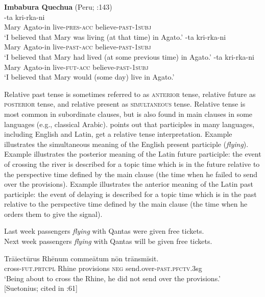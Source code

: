 \ea \label{ex:21.18}
\textbf{Imbabura Quechua} (Peru; \citealt{Cole1982}:143)\\
-ta  kri-rka-ni\\
Mary  Agato-in  live-\textsc{pres}-\textsc{acc}  believe-\textsc{past}-\textsc{1subj}\\
‘I believed that Mary was living (at that time) in Agato.’
-ta  kri-rka-ni\\
Mary  Agato-in  live-\textsc{past}-\textsc{acc}  believe-\textsc{past}-\textsc{1subj}\\
‘I believed that Mary had lived (at some previous time) in Agato.’
-ta  kri-rka-ni\\
Mary  Agato-in  live-\textsc{fut}-\textsc{acc}  believe-\textsc{past}-\textsc{1subj}\\
‘I believed that Mary would (some day) live in Agato.’
\z \z


Relative past tense is sometimes referred to as \textsc{anterior} tense, relative future as \textsc{posterior} tense, and relative present as \textsc{simultaneous} tense. Relative tense is most common in subordinate clauses, but is also found in main clauses in some languages (e.g., classical Arabic). \citet{Comrie1985} points out that participles in many languages, including English and Latin, get a relative tense interpretation. Example  illustrates the simultaneous meaning of the English present participle (\textit{flying}). Example  illustrates the posterior meaning of the Latin future participle: the event of crossing the river is described for a topic time which is in the future relative to the perspective time defined by the main clause (the time when he failed to send over the provisions). Example  illustrates the anterior meaning of the Latin past participle: the event of delaying is described for a topic time which is in the past relative to the perspective time defined by the main clause (the time when he orders them to give the signal).


\ea \label{ex:21.19}
\ea  Last week passengers \textit{flying} with Qantas were given free tickets.\\
\ex Next week passengers \textit{flying} with Qantas will be given free tickets.
                       \z
\z

\ea \label{ex:21.20}
\gll Trāiectūrus  Rhēnum  commeātum  nōn  trānsmīsit.\\
cross-\textsc{fut.prtcpl}  Rhine  provisions  \textsc{neg}  send.over-\textsc{past.pfctv.3}sg\\
\glt ‘Being about to cross the Rhine, he did not send over the provisions.’\\
{}[Suetonius; cited in \citealt{Comrie1985}:61]
\z

